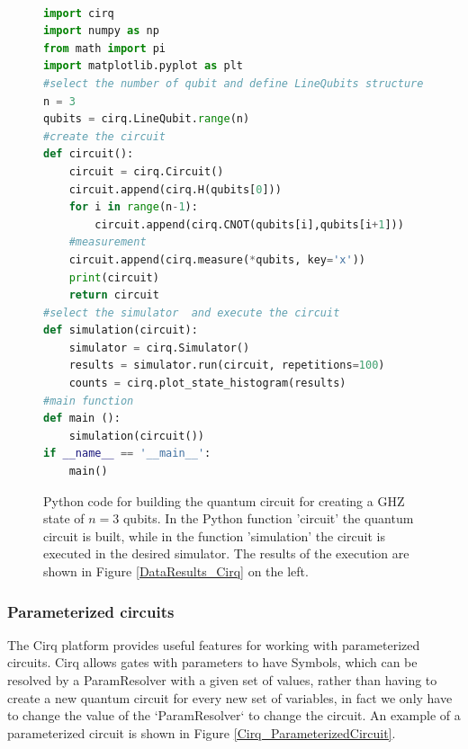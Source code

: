 \begin{figure}[h!]
\begin{lstlisting}[language=Python]%[language=Python, caption=Python example]

import cirq
import numpy as np
from math import pi
import matplotlib.pyplot as plt
#select the number of qubit and define LineQubits structure
n = 3 
qubits = cirq.LineQubit.range(n)
#create the circuit
def circuit():      
    circuit = cirq.Circuit()            
    circuit.append(cirq.H(qubits[0]))
    for i in range(n-1):    
        circuit.append(cirq.CNOT(qubits[i],qubits[i+1]))    
    #measurement
    circuit.append(cirq.measure(*qubits, key='x'))          
    print(circuit)        
    return circuit
#select the simulator  and execute the circuit
def simulation(circuit):           
    simulator = cirq.Simulator()
    results = simulator.run(circuit, repetitions=100)
    counts = cirq.plot_state_histogram(results)
#main function
def main ():    
    simulation(circuit())        
if __name__ == '__main__':
    main()
\end{lstlisting}
\caption{\label{GHZ_BuildCircuit} Python code for building the quantum circuit for creating a GHZ state of $n=3$ qubits. In the Python function 'circuit' the quantum circuit is built, while in the function 'simulation' the circuit is executed in the desired simulator. The results of the execution are shown in Figure \ref{DataResults_Cirq} on the left. }
\end{figure}

\subsubsection{Parameterized circuits}
The Cirq platform provides useful features for working with parameterized circuits. Cirq allows gates with parameters to have {\selectfont Symbols}, which can be resolved by a {\selectfont ParamResolver} with a given set of values, rather than having to create a new quantum circuit for every new set of variables,  in fact we only have to change the value of the `ParamResolver` to change the circuit. An example of a parameterized circuit is shown in Figure \ref{Cirq_ParameterizedCircuit}.


